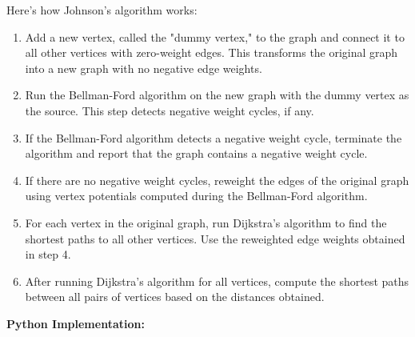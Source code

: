 \documentclass[12pt]{book} %
\begin{document}
Here's how Johnson's algorithm works:

\begin{enumerate}
    \item Add a new vertex, called the "dummy vertex," to the graph and connect it to all other vertices with zero-weight edges. This transforms the original graph into a new graph with no negative edge weights.
    \item Run the Bellman-Ford algorithm on the new graph with the dummy vertex as the source. This step detects negative weight cycles, if any.
    \item If the Bellman-Ford algorithm detects a negative weight cycle, terminate the algorithm and report that the graph contains a negative weight cycle.
    \item If there are no negative weight cycles, reweight the edges of the original graph using vertex potentials computed during the Bellman-Ford algorithm.
    \item For each vertex in the original graph, run Dijkstra's algorithm to find the shortest paths to all other vertices. Use the reweighted edge weights obtained in step 4.
    \item After running Dijkstra's algorithm for all vertices, compute the shortest paths between all pairs of vertices based on the distances obtained.
\end{enumerate}
\FloatBarrier
\textbf{Python Implementation:}
\FloatBarrier
\end{document}
